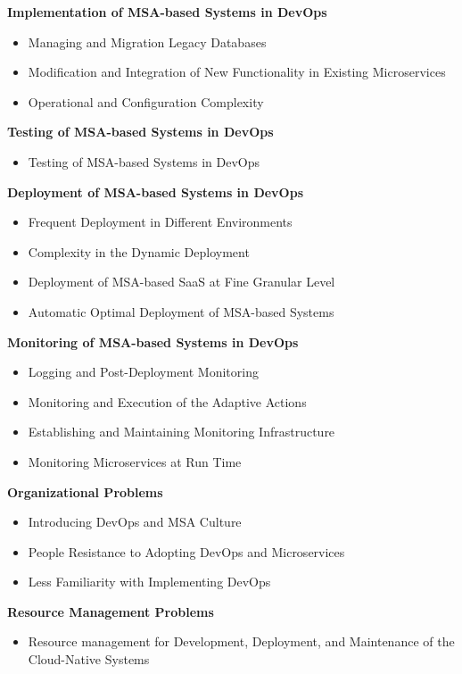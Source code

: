 \textbf{Implementation of MSA-based Systems in DevOps}
\begin{itemize}
    \item Managing and Migration Legacy Databases
    \item Modification and Integration of New Functionality in Existing
          Microservices
    \item Operational and Configuration Complexity
\end{itemize}

\textbf{Testing of MSA-based Systems in DevOps}
\begin{itemize}
    \item Testing of MSA-based Systems in DevOps
\end{itemize}

\textbf{Deployment of MSA-based Systems in DevOps}
\begin{itemize}
    \item Frequent Deployment in Different Environments
    \item Complexity in the Dynamic Deployment
    \item Deployment of MSA-based SaaS at Fine Granular Level
    \item Automatic Optimal Deployment of MSA-based Systems
\end{itemize}

\textbf{Monitoring of MSA-based Systems in DevOps}
\begin{itemize}
    \item Logging and Post-Deployment Monitoring
    \item Monitoring and Execution of the Adaptive Actions
    \item Establishing and Maintaining Monitoring Infrastructure
    \item Monitoring Microservices at Run Time
\end{itemize}

\textbf{Organizational Problems}
\begin{itemize}
    \item Introducing DevOps and MSA Culture
    \item People Resistance to Adopting DevOps and Microservices
    \item Less Familiarity with Implementing DevOps
\end{itemize}

\textbf{Resource Management Problems}
\begin{itemize}
    \item Resource management for Development, Deployment,
          and Maintenance of the Cloud-Native Systems
\end{itemize}

